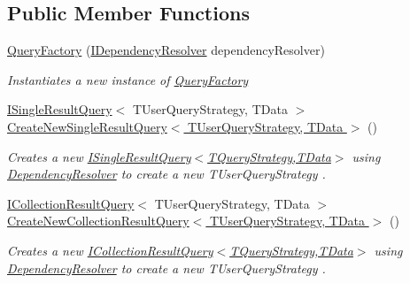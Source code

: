 \subsection*{Public Member Functions}
\begin{DoxyCompactItemize}
\item 
\hyperlink{classCqrs_1_1Repositories_1_1Queries_1_1QueryFactory_a8956a30f5d8abbf49ca4ca24756a83da_a8956a30f5d8abbf49ca4ca24756a83da}{Query\+Factory} (\hyperlink{interfaceCqrs_1_1Configuration_1_1IDependencyResolver}{I\+Dependency\+Resolver} dependency\+Resolver)
\begin{DoxyCompactList}\small\item\em Instantiates a new instance of \hyperlink{classCqrs_1_1Repositories_1_1Queries_1_1QueryFactory}{Query\+Factory} \end{DoxyCompactList}\item 
\hyperlink{interfaceCqrs_1_1Repositories_1_1Queries_1_1ISingleResultQuery}{I\+Single\+Result\+Query}$<$ T\+User\+Query\+Strategy, T\+Data $>$ \hyperlink{classCqrs_1_1Repositories_1_1Queries_1_1QueryFactory_aefca41f8cab3f333984b782e7c87f3d1_aefca41f8cab3f333984b782e7c87f3d1}{Create\+New\+Single\+Result\+Query$<$ T\+User\+Query\+Strategy, T\+Data $>$} ()
\begin{DoxyCompactList}\small\item\em Creates a new \hyperlink{interfaceCqrs_1_1Repositories_1_1Queries_1_1ISingleResultQuery}{I\+Single\+Result\+Query$<$\+T\+Query\+Strategy,\+T\+Data$>$} using \hyperlink{classCqrs_1_1Repositories_1_1Queries_1_1QueryFactory_a550e1e11b126247c5adebdd384000252_a550e1e11b126247c5adebdd384000252}{Dependency\+Resolver} to create a new {\itshape T\+User\+Query\+Strategy} . \end{DoxyCompactList}\item 
\hyperlink{interfaceCqrs_1_1Repositories_1_1Queries_1_1ICollectionResultQuery}{I\+Collection\+Result\+Query}$<$ T\+User\+Query\+Strategy, T\+Data $>$ \hyperlink{classCqrs_1_1Repositories_1_1Queries_1_1QueryFactory_aaadcf9eb14390c49d668023a9e9950d7_aaadcf9eb14390c49d668023a9e9950d7}{Create\+New\+Collection\+Result\+Query$<$ T\+User\+Query\+Strategy, T\+Data $>$} ()
\begin{DoxyCompactList}\small\item\em Creates a new \hyperlink{interfaceCqrs_1_1Repositories_1_1Queries_1_1ICollectionResultQuery}{I\+Collection\+Result\+Query$<$\+T\+Query\+Strategy,\+T\+Data$>$} using \hyperlink{classCqrs_1_1Repositories_1_1Queries_1_1QueryFactory_a550e1e11b126247c5adebdd384000252_a550e1e11b126247c5adebdd384000252}{Dependency\+Resolver} to create a new {\itshape T\+User\+Query\+Strategy} . \end{DoxyCompactList}\end{DoxyCompactItemize}
